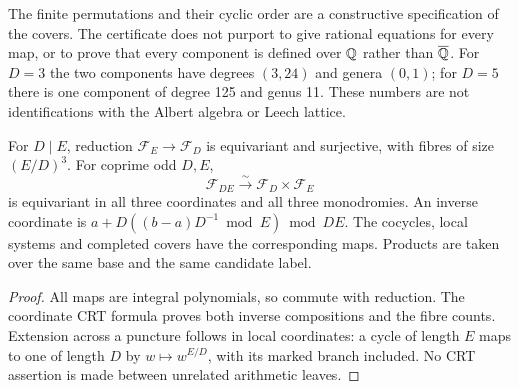 The finite permutations and their cyclic order are a constructive
specification of the covers. The certificate does not purport to give
rational equations for every map, or to prove that every component is
defined over $\mathbb Q$ rather than $\overline{\mathbb Q}$.
For $D=3$ the two components have degrees $(3,24)$ and genera $(0,1)$;
for $D=5$ there is one component of degree 125 and genus 11.
These numbers are not identifications with the Albert algebra or Leech lattice.

\begin{proposition}\label{prop:crt}
For $D\mid E$, reduction $\mathcal F_E\to\mathcal F_D$ is equivariant and
surjective, with fibres of size $(E/D)^3$. For coprime odd $D,E$,
\[
 \mathcal F_{DE}\xrightarrow{\sim}\mathcal F_D\times\mathcal F_E
\]
is equivariant in all three coordinates and all three monodromies. An
inverse coordinate is $a+D((b-a)D^{-1}\bmod E)\bmod DE$.
The cocycles, local systems and completed covers have the corresponding
maps. Products are taken over the same base and the same candidate label.
\end{proposition}
\begin{proof}
All maps are integral polynomials, so commute with reduction.
The coordinate CRT formula proves both inverse compositions and the
fibre counts. Extension across a puncture follows in local coordinates:
a cycle of length $E$ maps to one of length $D$ by $w\mapsto w^{E/D}$,
with its marked branch included. No CRT assertion is made between
unrelated arithmetic leaves.
\end{proof}
